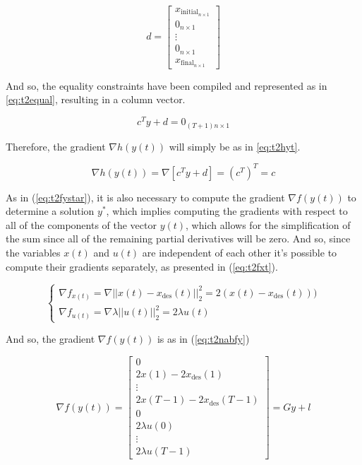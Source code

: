 \begin{equation}
\label{eq:t2d}
d = 
\left[
\begin{array}{c}
x_{{\text{initial}}_{n\times 1}} \\
0_{n\times 1} \\
\vdots \\
0_{n \times 1} \\
x_{{\text{final}}_{n\times 1}}
\end{array}
\right]
\end{equation}


And so, the equality constraints have been compiled and represented as in \eqref{eq:t2equal}, resulting in a column vector.

\begin{equation}
\label{eq:t2equal}
    c^T y + d = 0_{(T+1)n\times 1}
\end{equation}

Therefore, the gradient $\nabla h(y(t))$ will simply be as in \eqref{eq:t2hyt}.

\begin{equation}
\label{eq:t2hyt}
    \nabla h(y(t)) = \nabla [c^T y + d] = (c^T)^T = c
\end{equation}

As in (\ref{eq:t2fystar}), it is also necessary to compute the gradient $\nabla f(y(t))$ to determine a solution $y^*$, which implies computing the gradients with respect to all of the components of the vector $y(t)$, which allows for the simplification of the sum since all of the remaining partial derivatives will be zero. And so, since the variables $x(t)$ and $u(t)$ are independent of each other it's possible to compute their gradients separately, as presented in (\ref{eq:t2fxt}).

\begin{equation}
\label{eq:t2fxt}
\begin{cases}
	\nabla f_{x(t)} = \nabla ||x(t) - x_{\text{des}}(t)||_2^2 = 2(x(t) - x_\text{des}(t))) \\
	\nabla f_{u(t)} = \nabla \lambda||u(t)||_2^2 = 2\lambda u(t)
\end{cases}
\end{equation}

And so, the gradient $\nabla f(y(t))$ is as in (\ref{eq:t2nabfy})

\begin{equation}
\label{eq:t2nabfy}
\nabla f(y(t)) = 
\left[
\begin{array}{c}
0 \\
2 x(1) - 2x_\text{des}(1) \\
\vdots \\
2 x(T-1) - 2x_\text{des}(T-1) \\
0 \\
2\lambda u(0) \\
\vdots \\
2 \lambda u(T-1)
\end{array}
\right]
= Gy + l
\end{equation}

